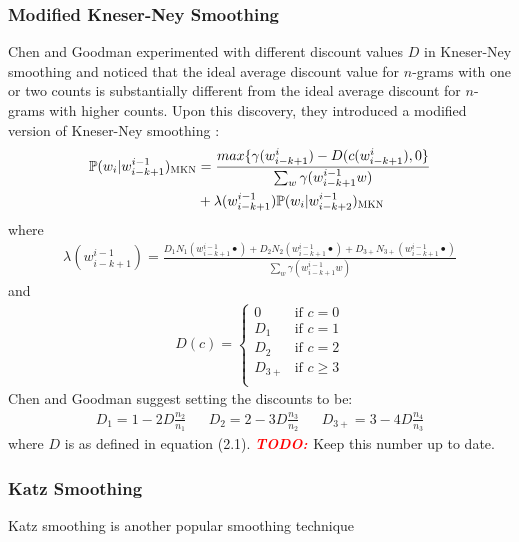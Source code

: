 \documentclass[a4paper, 12pt]{report}
\newcommand{\todo}{\textbf{\textit{\textcolor{red}{TODO: }}}}
\begin{document}
\subsubsection{Modified Kneser-Ney Smoothing}

Chen and Goodman experimented with different discount values $D$ in Kneser-Ney smoothing and noticed that the ideal average discount value for $n$-grams with one or two counts is substantially different from the ideal average discount for $n$-grams with higher counts. Upon this discovery, they introduced a modified version of Kneser-Ney smoothing \cite{modified_kneser_ney:chen1999}:
\begin{equation*}
\begin{aligned}
	\mathbb{P}(w_i | w_{i - k + 1}^{i - 1})_{\text{\scshape MKN}} &= \frac{max\{\gamma(w_{i - k + 1}^{i}) - D(c(w_{i - k + 1}^{i}), 0\}}{\sum_w \gamma(w_{i - k + 1}^{i - 1}w)} \\
	&+ \lambda(w_{i - k + 1}^{i - 1})\mathbb{P}(w_i | w_{i - k + 2}^{i - 1})_{\text{\scshape MKN}}
\end{aligned}
\end{equation*}
where
\begin{gather*}
	\lambda(w_{i - k + 1}^{i - 1}) = \frac{D_1N_1(w_{i - k + 1}^{i - 1}\bullet) + D_2N_2(w_{i - k + 1}^{i - 1}\bullet) + D_{3+}N_{3+}(w_{i - k + 1}^{i - 1}\bullet)}{\sum_w \gamma(w_{i - k + 1}^{i - 1}w)}
\end{gather*}
and
\begin{gather*}
	D(c) = \begin{cases}
		0 &\text{if }c = 0 \\
		D_1 &\text{if }c = 1 \\
		D_2 &\text{if }c = 2 \\
		D_{3+} &\text{if }c \geq 3 \\
	\end{cases}
\end{gather*}
Chen and Goodman suggest setting the discounts to be:
\begin{align*}
	D_1 = 1 - 2D\frac{n_2}{n_1} && D_2 = 2 - 3D\frac{n_3}{n_2} && D_{3+} = 3 - 4D\frac{n_4}{n_3}
\end{align*}
where $D$ is as defined in equation (2.1). \todo{Keep this number up to date}.

\subsubsection{Katz Smoothing}

Katz smoothing \cite{katz_smoothing:katz1987} is another popular smoothing technique
\end{document}
